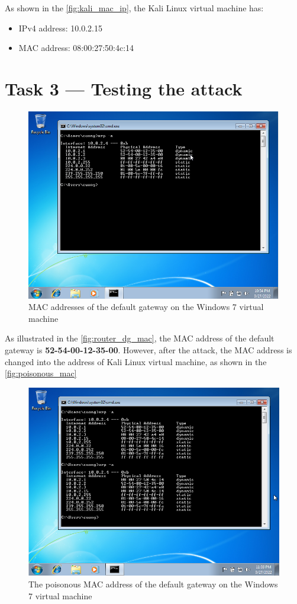 \documentclass{article}
\begin{document}
As shown in the \autoref{fig:kali_mac_ip}, the Kali Linux virtual machine has:
\begin{itemize}
    \item IPv4 address: 10.0.2.15
    \item MAC address: 08:00:27:50:4c:14
\end{itemize}

\section*{Task 3 --- Testing the attack}
%
\begin{figure}[!hpt]
    \centering
    \includegraphics[height=\textheight,width=\textwidth,keepaspectratio]{win7_gateway_router_mac.png}
    \caption{MAC addresses of the default gateway on the Windows 7 virtual machine}
    \label{fig:router_dg_mac}
\end{figure}

As illustrated in the \autoref{fig:router_dg_mac}, the MAC address of the default gateway is
\textbf{52-54-00-12-35-00}. However, after the attack, the MAC address is changed into the
address of Kali Linux virtual machine, as shown in the \autoref{fig:poisonous_mac}

\begin{figure}[!hpt]
    \centering
    \includegraphics[width=\textwidth,height=\textheight,keepaspectratio]{arp_poisoned_mac.png}
    \caption{The poisonous MAC address of the default gateway on the Windows 7 virtual machine}
    \label{fig:poisonous_mac}
\end{figure}
\end{document}
